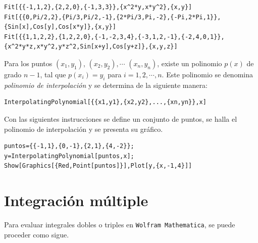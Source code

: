 \begin{tcolorbox}[title=Instrucciones en Mathematica]
\begin{Verbatim}[formatcom=\letraverbatim]
Fit[{{-1,1,2},{2,2,0},{-1,3,3}},{x^2*y,x*y^2},{x,y}]
Fit[{{0,Pi/2,2},{Pi/3,Pi/2,-1},{2*Pi/3,Pi,-2},{-Pi,2*Pi,1}},
{Sin[x],Cos[y],Cos[x*y]},{x,y}]
Fit[{{1,1,2,2},{1,2,2,0},{-1,-2,3,4},{-3,1,2,-1},{-2,4,0,1}},
{x^2*y*z,x*y^2,y*z^2,Sin[x+y],Cos[y+z]},{x,y,z}]
\end{Verbatim}
\end{tcolorbox}

Para los puntos $(x_1,y_1)$, $(x_2,y_2),\cdots$ $(x_n,y_n)$, existe un polinomio $p(x)$
de grado $n-1$, tal que $p(x_i)=y_i$ para $i=1,2,\cdots,n$.
Este polinomio se denomina \emph{polinomio de interpolación} y se determina
de la siguiente manera:
\begin{tcolorbox}[title=Polinomio de interpolación]
\begin{Verbatim}[formatcom=\letraverbatim]
InterpolatingPolynomial[{{x1,y1},{x2,y2},...,{xn,yn}},x]
\end{Verbatim}
\end{tcolorbox}

Con las siguientes instrucciones se define un conjunto de puntos, se halla
el polinomio de interpolación y se presenta su gráfico.
\begin{tcolorbox}
\begin{Verbatim}[formatcom=\letraverbatim]
puntos={{-1,1},{0,-1},{2,1},{4,-2}};
y=InterpolatingPolynomial[puntos,x];
Show[Graphics[{Red,Point[puntos]}],Plot[y,{x,-1,4}]]
\end{Verbatim}
\end{tcolorbox}

\section{Integración múltiple}
Para evaluar integrales dobles o triples en \verb"Wolfram Mathematica",
se puede proceder como sigue.

\clearpage

